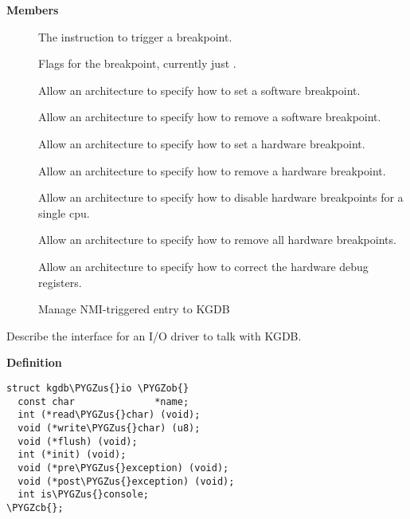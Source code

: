 \documentclass[a4paper,8pt,english]{sphinxmanual}
\def\PYGZus{\char`\_}
\def\PYGZob{\char`\{}
\def\PYGZcb{\char`\}}
\begin{document}
\textbf{Members}
\begin{description}
\item[{}] \leavevmode
The instruction to trigger a breakpoint.

\item[{}] \leavevmode
Flags for the breakpoint, currently just .

\item[{}] \leavevmode
Allow an architecture to specify how to set a software
breakpoint.

\item[{}] \leavevmode
Allow an architecture to specify how to remove a
software breakpoint.

\item[{}] \leavevmode
Allow an architecture to specify how to set a hardware
breakpoint.

\item[{}] \leavevmode
Allow an architecture to specify how to remove a
hardware breakpoint.

\item[{}] \leavevmode
Allow an architecture to specify how to disable
hardware breakpoints for a single cpu.

\item[{}] \leavevmode
Allow an architecture to specify how to remove all
hardware breakpoints.

\item[{}] \leavevmode
Allow an architecture to specify how to correct the
hardware debug registers.

\item[{}] \leavevmode
Manage NMI-triggered entry to KGDB

\end{description}

\begin{fulllineitems}
\label{dev-tools/kgdb:c.kgdb_io}
Describe the interface for an I/O driver to talk with KGDB.

\end{fulllineitems}


\textbf{Definition}

\begin{Verbatim}[commandchars=\\\{\}]
struct kgdb\PYGZus{}io \PYGZob{}
  const char              *name;
  int (*read\PYGZus{}char) (void);
  void (*write\PYGZus{}char) (u8);
  void (*flush) (void);
  int (*init) (void);
  void (*pre\PYGZus{}exception) (void);
  void (*post\PYGZus{}exception) (void);
  int is\PYGZus{}console;
\PYGZcb{};
\end{Verbatim}
\end{document}

